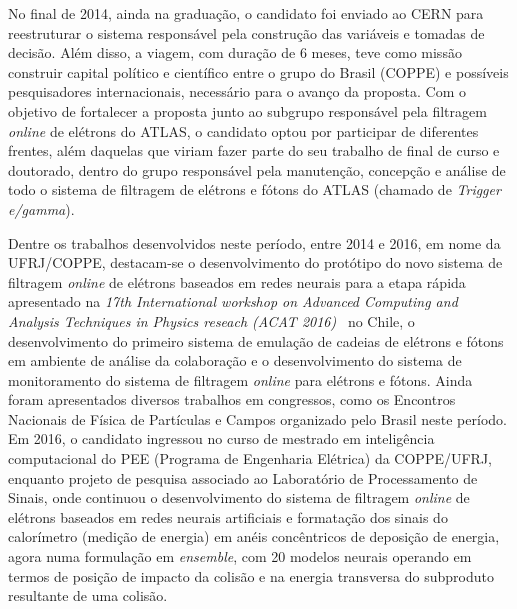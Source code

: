 No final de 2014, ainda na graduação, o candidato foi enviado ao CERN para reestruturar o sistema 
responsável pela construção das variáveis e tomadas de decisão. Além disso, a viagem, com duração 
de 6 meses, teve como missão construir capital político e científico entre o grupo do 
Brasil (COPPE) e possíveis pesquisadores internacionais, necessário para o avanço da 
proposta. Com o objetivo de fortalecer a proposta junto ao subgrupo responsável pela filtragem 
\emph{online} de elétrons do ATLAS, o candidato optou por participar de diferentes frentes, além 
daquelas que viriam fazer parte do seu trabalho de final de curso e doutorado, dentro do 
grupo responsável pela manutenção, concepção e análise de todo o sistema de filtragem de 
elétrons e fótons do ATLAS (chamado de \emph{Trigger e/gamma}).



Dentre os trabalhos desenvolvidos neste período, entre 2014 e 2016, em nome da UFRJ/COPPE, 
destacam-se o desenvolvimento do protótipo do novo sistema de filtragem \emph{online} de elétrons 
baseados em redes neurais para a etapa rápida apresentado na \emph{17th International workshop on 
Advanced Computing and Analysis Techniques in Physics reseach (ACAT 2016)}~\cite{acat2016} no Chile, o 
desenvolvimento do primeiro sistema de emulação de cadeias de elétrons e fótons em ambiente de 
análise da colaboração e o desenvolvimento do sistema de monitoramento do sistema de 
filtragem \emph{online} para elétrons e fótons. Ainda foram apresentados diversos trabalhos em 
congressos, como os Encontros Nacionais de Física de Partículas e Campos 
organizado pelo Brasil neste período.
Em 2016, o candidato ingressou no curso de mestrado em inteligência computacional do 
PEE (Programa de Engenharia Elétrica) da COPPE/UFRJ, enquanto projeto de pesquisa associado 
ao Laboratório de Processamento de Sinais, onde continuou o desenvolvimento do sistema de 
filtragem \emph{online} de elétrons baseados em redes neurais artificiais e formatação dos sinais 
do calorímetro (medição de energia) em anéis concêntricos de deposição de energia, agora 
numa formulação em \emph{ensemble}, com 20 modelos neurais operando em termos de posição de impacto 
da colisão e na energia transversa do subproduto resultante de uma colisão.


